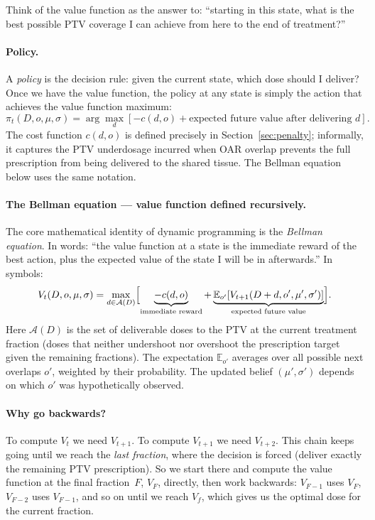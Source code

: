 \documentclass[11pt]{article}
\theoremstyle{definition}
\begin{document}
Think of the value function as the answer to: ``starting in this state,
what is the best possible PTV coverage I can achieve from here to the
end of treatment?''

\paragraph{Policy.}
A \emph{policy} is the decision rule: given the current state, which dose
should I deliver?  Once we have the value function, the policy at any state
is simply the action that achieves the value function maximum:
\[
  \pi_t(D, o, \mu, \sigma)
  = \arg\max_{d}\!\left[-c(d,o) + \text{expected future value after delivering } d\right].
\]
The cost function $c(d, o)$ is defined precisely in Section~\ref{sec:penalty};
informally, it captures the PTV underdosage incurred when OAR overlap
prevents the full prescription from being delivered to the shared tissue.  The Bellman equation below uses the same notation.

\paragraph{The Bellman equation --- value function defined recursively.}
The core mathematical identity of dynamic programming is the \emph{Bellman
equation}.  In words: ``the value function at a state is the immediate reward
of the best action, plus the expected value of the state I will be in
afterwards.''  In symbols:
\begin{equation}
  V_t(D, o, \mu, \sigma)
  = \max_{d \in \mathcal{A}(D)}
    \Bigl[\underbrace{-c(d,o)}_{\text{immediate reward}}
    + \underbrace{\mathbb{E}_{o'}\!\left[V_{t+1}(D+d, o', \mu', \sigma')\right]}_{\text{expected future value}}\Bigr].
  \label{eq:bellman_words}
\end{equation}
Here $\mathcal{A}(D)$ is the set of deliverable doses to the PTV at the
current treatment fraction (doses that neither undershoot nor overshoot the
prescription target given the remaining fractions).
The expectation $\mathbb{E}_{o'}$ averages over all possible next overlaps
$o'$, weighted by their probability.  The updated belief $(\mu', \sigma')$
depends on which $o'$ was hypothetically observed.

\paragraph{Why go backwards?}
To compute $V_t$ we need $V_{t+1}$.  To compute $V_{t+1}$ we need $V_{t+2}$.
This chain keeps going until we reach the \emph{last fraction}, where the
decision is forced (deliver exactly the remaining PTV prescription).
So we start there and compute the value function at the final fraction~$F$,
$V_F$, directly, then work backwards: $V_{F-1}$ uses $V_F$, $V_{F-2}$ uses
$V_{F-1}$, and so on until we reach $V_f$, which gives us the optimal dose
for the current fraction.
\end{document}
